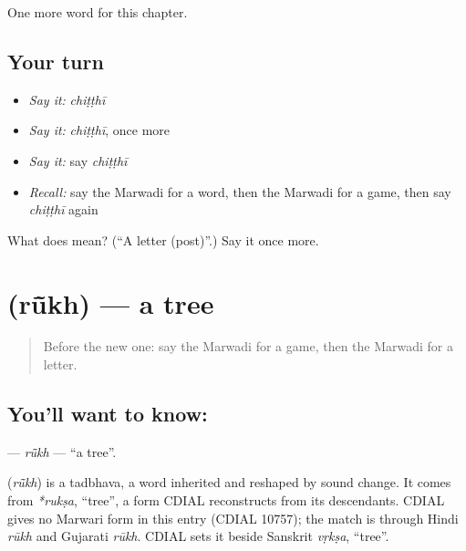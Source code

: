 \begin{grammarlens}[title={What you've built}]
One more word for this chapter.
\end{grammarlens}

\subsection*{Your turn}
\begin{itemize}
\raggedright
  \item \emph{Say it:} \emph{chiṭṭhī}
  \item \emph{Say it:} \emph{chiṭṭhī}, once more
  \item \emph{Say it:} say \emph{chiṭṭhī}
  \item \emph{Recall:} say the Marwadi for a word, then the Marwadi for a game, then say \emph{chiṭṭhī} again
\end{itemize}

\begin{tcolorbox}[breakable,colback=teal!4,colframe=teal!35!black,title={Before you move on}]
What does  mean? (\textquotedblleft{}A letter (post)\textquotedblright{}.) Say it once more.
\end{tcolorbox}
\section[\texorpdfstring{\mw{रूंख} (rū̃kh)}{रूंख (rū̃kh)}]{ (rū̃kh) — a tree}

\label{lesson:MW-C67-rukh}



\begin{quote}
Before the new one: say the Marwadi for a game, then the Marwadi for a letter.
\end{quote}

\subsection*{You'll want to know: }
\textbf{} — \emph{rū̃kh} — \textquotedblleft{}a tree\textquotedblright{}.

\begin{cousinweb}
\textbf{} (\emph{rū̃kh}) is a tadbhava, a word inherited and reshaped by sound change. It comes from \emph{*rukṣa}, \textquotedblleft{}tree\textquotedblright{}, a form CDIAL reconstructs from its descendants. CDIAL gives no Marwari form in this entry (CDIAL 10757); the match is through Hindi \emph{rūkh} and Gujarati \emph{rūkh}. CDIAL sets it beside Sanskrit \emph{vṛkṣa}, \textquotedblleft{}tree\textquotedblright{}.
\end{cousinweb}

